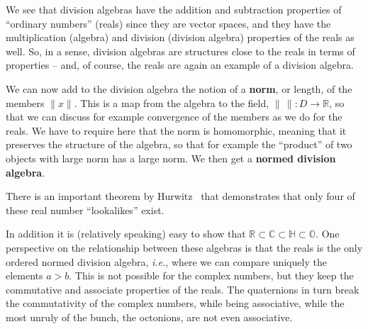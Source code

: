 \documentclass[notes.tex]{subfiles}
\begin{document}
We see that division algebras have the addition and subtraction properties of ``ordinary numbers'' (reals) since they are vector spaces, and they have the  multiplication (algebra) and division (division algebra) properties of the reals as well. So, in a sense, division algebras are structures close to the reals in terms of properties -- and, of course, the reals are again an example of a division algebra. 

We can now add to the division algebra the notion of a {\bf norm}, or length, of the members $\|x\|$. This is a map from the algebra to the field, $\|\,\|:D\to\mathbb{R}$, so that we can discuss for example convergence of the members as we do for the reals. We have to require here that the norm is homomorphic, meaning that it preserves the structure of the algebra, so that for example the ``product''  of two objects with large norm has a large norm. We then get a {\bf normed division algebra}. 

There is an important theorem by Hurwitz~\cite{Hurwitz1923} that demonstrates that only four of these real number ``lookalikes'' exist.

In addition it is (relatively speaking) easy to show that $\mathbb{R} \subset\mathbb{C}\subset\mathbb{H}\subset\mathbb{O}$. One perspective on the relationship between these algebras is that the reals is the only ordered normed division algebra, {\it i.e.}, where we can compare uniquely the elements $a>b$. This is not possible for the complex numbers, but they keep the commutative and associate properties of the reals. The quaternions in turn break the commutativity of the complex numbers, while being associative, while the most unruly of the bunch, the octonions, are not even associative.


\end{document}

